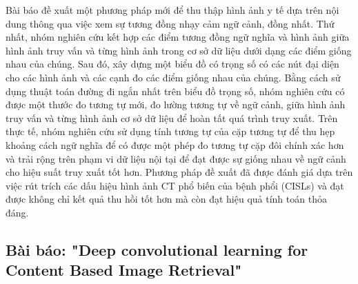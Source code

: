 \documentclass[a4paper,14pt]{extreport}
\begin{document}
Bài báo đề xuất một phương pháp mới để thu thập hình ảnh y tế dựa trên nội dung thông qua việc xem sự tương đồng nhạy cảm ngữ cảnh, đồng nhất. Thứ nhất, nhóm nghiên cứu kết hợp các điểm tương đồng ngữ nghĩa và hình ảnh giữa hình ảnh truy vấn và từng hình ảnh trong cơ sở dữ liệu dưới dạng các điểm giống nhau của chúng. Sau đó, xây dựng một biểu đồ có trọng số có các nút đại diện cho các hình ảnh và các cạnh đo các điểm giống nhau của chúng. Bằng cách sử dụng thuật toán đường đi ngắn nhất trên biểu đồ trọng số, nhóm nghiên cứu có được một thước đo tương tự mới, đo lường tương tự về ngữ cảnh, giữa hình ảnh truy vấn và từng hình ảnh cơ sở dữ liệu để hoàn tất quá trình truy xuất. Trên thực tế, nhóm nghiên cứu sử dụng tính tương tự của cặp tương tự để thu hẹp khoảng cách ngữ nghĩa để có được một phép đo tương tự cặp đôi chính xác hơn và trải rộng trên phạm vi dữ liệu nội tại để đạt được sự giống nhau về ngữ cảnh cho hiệu suất truy xuất tốt hơn. Phương pháp đề xuất đã được đánh giá dựa trên việc rút trích các dấu hiệu hình ảnh CT phổ biến của bệnh phổi (CISLs) và đạt được không chỉ kết quả thu hồi tốt hơn mà còn đạt hiệu quả tính toán thỏa đáng.


\subsection{Bài báo: "Deep convolutional learning for Content Based Image Retrieval" \cite{paper-4}}
\end{document}
